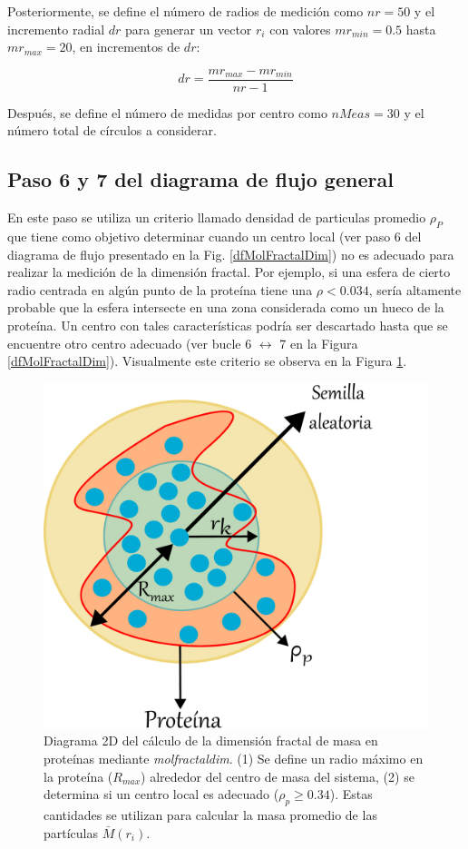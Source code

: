 	Posteriormente, se define el número de radios de medición como \(nr = 50\) y el incremento radial \(dr\) 
 	para  generar un vector \(r_i\) con valores \(mr_{min}= 0.5\) hasta \(mr_{max} = 20\), en incrementos de \(dr\):
 
 	\begin{equation}
 		 	dr = \frac{mr_{max} - mr_{min}}{nr - 1}
 	\end{equation}
	
	 Después, se define el n\'{u}mero de medidas por centro como \(nMeas = 30\) y el n\'{u}mero total 
	 de c\'{i}rculos a considerar.
	 
	 
	 \subsection{Paso 6 y 7 del diagrama de flujo general}
	 
	 En este paso se utiliza un criterio llamado densidad de particulas promedio \(\rho_{P}\) que tiene como objetivo determinar cuando un centro local (ver paso 6 del diagrama de flujo presentado en la Fig. \ref{dfMolFractalDim}) no es adecuado para realizar la medici\'{o}n de la dimensi\'{o}n fractal. Por ejemplo, si una esfera de cierto radio centrada en alg\'{u}n punto de la proteína tiene una $\rho < 0.034$, ser\'{i}a altamente probable que la esfera intersecte en una zona considerada como un hueco de la prote\'{i}na. Un centro con tales caracter\'{i}sticas podr\'{i}a ser descartado hasta que se encuentre otro centro adecuado (ver bucle 6 $\longleftrightarrow$ 7 en la Figura \ref{dfMolFractalDim}). Visualmente este criterio se observa en la Figura \ref{fig:centrob}. 
	 
	 	\begin{figure}[H]
	 	\centering
	 	\includegraphics[width=0.5\linewidth]{graphs/centrob4.pdf}
	 	\caption{Diagrama 2D del c\'{a}lculo de la dimensi\'{o}n fractal de masa en prote\'{i}nas mediante \textit{molfractaldim}. (1) Se define un radio m\'{a}ximo en la prote\'{i}na ($R_{max}$) alrededor del centro de masa del sistema, (2) se determina si un centro local es adecuado ($\rho_{p} \geq 0.34$). Estas cantidades se utilizan para calcular la masa promedio de las part\'{i}culas $\bar{M}(r_i)$.}
	 	\label{fig:centrob}
	 \end{figure}
	 

